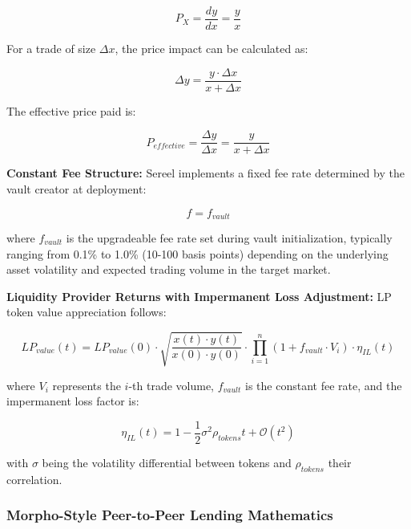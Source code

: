 \documentclass[12pt]{article}
\begin{document}
\begin{equation}
P_X = \frac{dy}{dx} = \frac{y}{x}
\end{equation}

For a trade of size $\Delta x$, the price impact can be calculated as:

\begin{equation}
\Delta y = \frac{y \cdot \Delta x}{x + \Delta x}
\end{equation}

The effective price paid is:

\begin{equation}
P_{effective} = \frac{\Delta y}{\Delta x} = \frac{y}{x + \Delta x}
\end{equation}

\textbf{Constant Fee Structure:}
Sereel implements a fixed fee rate determined by the vault creator at deployment:

\begin{equation}
f = f_{vault}
\end{equation}

where $f_{vault}$ is the upgradeable fee rate set during vault initialization, typically ranging from 0.1\% to 1.0\% (10-100 basis points) depending on the underlying asset volatility and expected trading volume in the target market.

\textbf{Liquidity Provider Returns with Impermanent Loss Adjustment:}
LP token value appreciation follows:

\begin{equation}
LP_{value}(t) = LP_{value}(0) \cdot \sqrt{\frac{x(t) \cdot y(t)}{x(0) \cdot y(0)}} \cdot \prod_{i=1}^{n} (1 + f_{vault} \cdot V_i) \cdot \eta_{IL}(t)
\end{equation}

where $V_i$ represents the $i$-th trade volume, $f_{vault}$ is the constant fee rate, and the impermanent loss factor is:

\begin{equation}
\eta_{IL}(t) = 1 - \frac{1}{2} \sigma^2 \rho_{tokens} t + \mathcal{O}(t^2)
\end{equation}

with $\sigma$ being the volatility differential between tokens and $\rho_{tokens}$ their correlation.

\subsubsection{Morpho-Style Peer-to-Peer Lending Mathematics}
\end{document}
